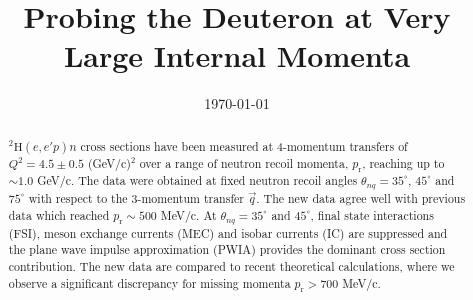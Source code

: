 \documentclass[aps,prl,twocolumn,showpacs,superscriptaddress,groupedaddress]{revtex4-2}  %
\begin{document}
\title{Probing the Deuteron at Very Large Internal Momenta}



\date{\today}

\begin{abstract}
  $^{2}\mathrm{H}(e,e'p)n$ cross sections have been measured at 4-momentum transfers of $Q^{2} = 4.5 \pm 0.5$ (GeV/c)$^{2}$
  over a range of neutron recoil momenta, $p_{\mathrm{r}}$,  reaching up to $\sim1.0$ GeV/c. The data were
  obtained at fixed neutron recoil angles $\theta_{nq} = 35^\circ$, $45^\circ$ and $75^{\circ}$  with respect to the 3-momentum
  transfer $\vec q$. The new data agree well with previous data which reached $p_{\mathrm{r}}\sim500$ MeV/c. At $\theta_{nq} = 35^\circ$
  and $45^\circ$, final state interactions (FSI), meson exchange currents (MEC) and isobar currents (IC) are suppressed and
  the plane wave impulse approximation (PWIA) provides the dominant cross section contribution. The new data are compared to recent
  theoretical calculations, where we observe a significant discrepancy for missing momenta $p_{\mathrm{r}}>700$ MeV/c. 
\end{abstract}

\maketitle
\end{document}
